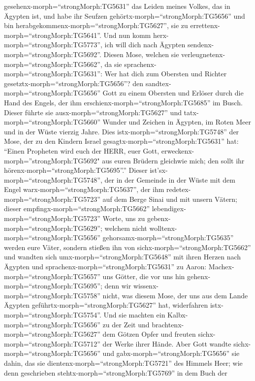 gesehenx-morph=``strongMorph:TG5631'' das Leiden meines Volkes, das in
Ägypten ist, und habe ihr Seufzen gehörtx-morph=``strongMorph:TG5656''
und bin herabgekommenx-morph=``strongMorph:TG5627'', sie zu
errettenx-morph=``strongMorph:TG5641''. Und nun komm
herx-morph=``strongMorph:TG5773'', ich will dich nach Ägypten
sendenx-morph=``strongMorph:TG5692''.  Diesen Mose, welchen
sie verleugnetenx-morph=``strongMorph:TG5662'', da sie
sprachenx-morph=``strongMorph:TG5631'': Wer hat dich zum Obersten und
Richter gesetztx-morph=``strongMorph:TG5656''? den
sandtex-morph=``strongMorph:TG5656'' Gott zu einem Obersten und Erlöser
durch die Hand des Engels, der ihm
erschienx-morph=``strongMorph:TG5685'' im Busch.  Dieser
führte sie ausx-morph=``strongMorph:TG5627'' und
tatx-morph=``strongMorph:TG5660'' Wunder und Zeichen in Ägypten, im
Roten Meer und in der Wüste vierzig Jahre.  Dies
istx-morph=``strongMorph:TG5748'' der Mose, der zu den Kindern Israel
gesagtx-morph=``strongMorph:TG5631'' hat: ``Einen Propheten wird euch
der HERR, euer Gott, erweckenx-morph=''strongMorph:TG5692" aus euren
Brüdern gleichwie mich; den sollt ihr
hörenx-morph=``strongMorph:TG5695''.''  Dieser
ist'sx-morph=``strongMorph:TG5748'', der in der Gemeinde in der Wüste
mit dem Engel warx-morph=``strongMorph:TG5637'', der ihm
redetex-morph=``strongMorph:TG5723'' auf dem Berge Sinai und mit unsern
Vätern; dieser empfingx-morph=``strongMorph:TG5662''
lebendigex-morph=``strongMorph:TG5723'' Worte, uns zu
gebenx-morph=``strongMorph:TG5629'';  welchem nicht
wolltenx-morph=``strongMorph:TG5656''
gehorsamx-morph=``strongMorph:TG5635'' werden eure Väter, sondern
stießen ihn von sichx-morph=``strongMorph:TG5662'' und wandten sich
umx-morph=``strongMorph:TG5648'' mit ihren Herzen nach Ägypten
 und sprachenx-morph=``strongMorph:TG5631'' zu Aaron:
Machex-morph=``strongMorph:TG5657'' uns Götter, die vor uns hin
gehenx-morph=``strongMorph:TG5695''; denn wir
wissenx-morph=``strongMorph:TG5758'' nicht, was diesem Mose, der uns aus
dem Lande Ägypten geführtx-morph=``strongMorph:TG5627'' hat, widerfahren
istx-morph=``strongMorph:TG5754''.  Und sie machten ein
Kalbx-morph=``strongMorph:TG5656'' zu der Zeit und
brachtenx-morph=``strongMorph:TG5627'' dem Götzen Opfer und freuten
sichx-morph=``strongMorph:TG5712'' der Werke ihrer Hände. 
Aber Gott wandte sichx-morph=``strongMorph:TG5656'' und
gabx-morph=``strongMorph:TG5656'' sie dahin, das sie
dientenx-morph=``strongMorph:TG5721'' des Himmels Heer; wie denn
geschrieben stehtx-morph=``strongMorph:TG5769'' in dem Buch der
